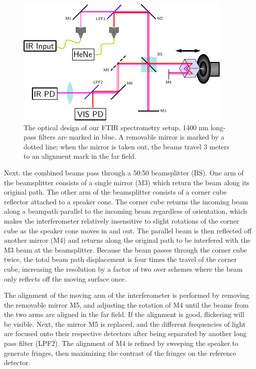 \documentclass[12pt]{puthesis}
\begin{document}
\begin{figure}[b]
  \centering
  \includegraphics[width=\textwidth]{FTIRSetupDiagram}
  \caption{The optical design of our FTIR spectrometry setup. 1400 nm long-pass filters are marked in blue. A removable mirror is marked by a dotted line; when the mirror is taken out, the beams travel 3 meters to an alignment mark in the far field. }
  \label{fig:ftirdiagram}
\end{figure}

Next, the combined beams pass through a 50:50 beamsplitter (BS). One arm of the beamsplitter consists of a single mirror (M3) which return the beam along its original path. The other arm of the beamsplitter consists of a corner cube reflector attached to a speaker cone. The corner cube returns the incoming beam along a beampath parallel to the incoming beam regardless of orientation, which makes the interferometer relatively insensitive to slight rotations of the corner cube as the speaker cone moves in and out. The parallel beam is then reflected off another mirror (M4) and returns along the original path to be interfered with the M3 beam at the beamsplitter. Because the beam passes through the corner cube twice, the total beam path displacement is four times the travel of the corner cube, increasing the resolution by a factor of two over schemes where the beam only reflects off the moving surface once.

The alignment of the moving arm of the interferometer is performed by removing the removable mirror M5, and adjusting the rotation of M4 until the beams from the two arms are aligned in the far field. If the alignment is good, flickering will be visible. Next, the mirror M5 is replaced, and the different frequencies of light are focused onto their respective detectors after being separated by another long pass filter (LPF2). The alignment of M4 is refined by sweeping the speaker to generate fringes, then maximizing the contrast of the fringes on the reference detector.
\end{document}
